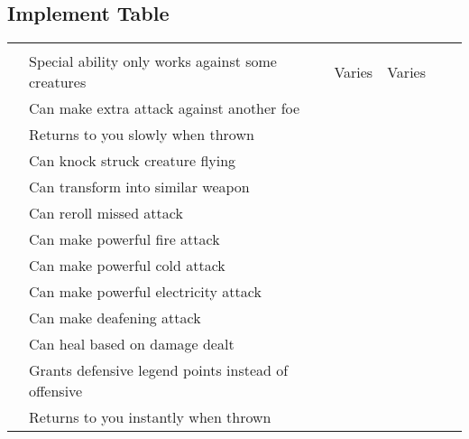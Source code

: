     \onecolumn
    \subsection{Implement Table}

        \begin{longtabuwrapper}
            \begin{longtabu}{l X l l l l}
                 &  &  &  &  \\
                 & Special ability only works against some creatures & Varies & Varies &  \\
                 & Can make extra attack against another foe &  &  \\
                 & Returns to you slowly when thrown &  &  \\
                 & Can knock struck creature flying &  &  \\
                 & Can transform into similar weapon &  &  \\
                 & Can reroll missed attack &  &  \\
                 & Can make powerful fire attack &  &  \\
                 & Can make powerful cold attack &  &  \\
                 & Can make powerful electricity attack &  &  \\
                 & Can make deafening attack &  &  \\
                 & Can heal based on damage dealt &  &  \\
                 & Grants defensive legend points instead of offensive &  &  \\
                 & Returns to you instantly when thrown &  &  \\

\end{longtabu}
\end{longtabuwrapper}
